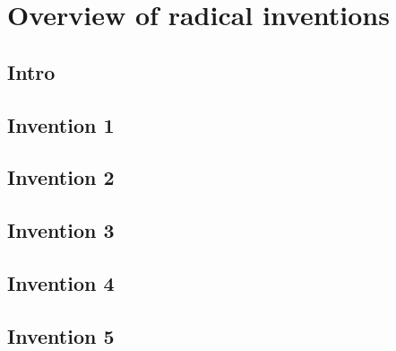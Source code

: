 \chapter{Overview of radical inventions}

\section{Intro}

\section{Invention 1}

\section{Invention 2}

\section{Invention 3}

\section{Invention 4}

\section{Invention 5}